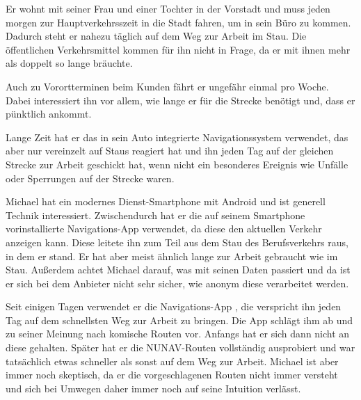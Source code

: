 Er wohnt mit seiner Frau und einer Tochter in der Vorstadt und muss jeden morgen zur Hauptverkehrsszeit in die Stadt fahren, um in sein Büro zu kommen. Dadurch steht er nahezu täglich auf dem Weg zur Arbeit im Stau. Die öffentlichen Verkehrsmittel kommen für ihn nicht in Frage, da er mit ihnen mehr als doppelt so lange bräuchte.

Auch zu Vorortterminen beim Kunden fährt er ungefähr einmal pro Woche. Dabei interessiert ihn vor allem, wie lange er für die Strecke benötigt und, dass er pünktlich ankommt.

Lange Zeit hat er das in sein Auto integrierte Navigationssystem verwendet, das aber nur vereinzelt auf Staus reagiert hat und ihn jeden Tag auf der gleichen Strecke zur Arbeit geschickt hat, wenn nicht ein besonderes Ereignis wie Unfälle oder Sperrungen auf der Strecke waren.

Michael hat ein modernes Dienst-Smartphone mit Android und ist generell Technik interessiert. Zwischendurch hat er die auf seinem Smartphone vorinstallierte Navigations-App verwendet, da diese den aktuellen Verkehr anzeigen kann. Diese leitete ihn zum Teil aus dem Stau des Berufsverkehrs raus, in dem er stand. Er hat aber meist ähnlich lange zur Arbeit gebraucht wie im Stau. Außerdem achtet Michael darauf, was mit seinen Daten passiert und da ist er sich bei dem Anbieter nicht sehr sicher, wie anonym diese verarbeitet werden.

Seit einigen Tagen verwendet er die Navigations-App , die verspricht ihn jeden Tag auf dem schnellsten Weg zur Arbeit zu bringen. Die App schlägt ihm ab und zu seiner Meinung nach \glqq komische\grqq{} Routen vor. Anfangs hat er sich dann nicht an diese gehalten. Später hat er die NUNAV-Routen vollständig ausprobiert und war tatsächlich etwas schneller als sonst auf dem Weg zur Arbeit. Michael ist aber immer noch skeptisch, da er die vorgeschlagenen Routen nicht immer versteht und sich bei Umwegen daher immer noch auf seine Intuition verlässt.

\newpage